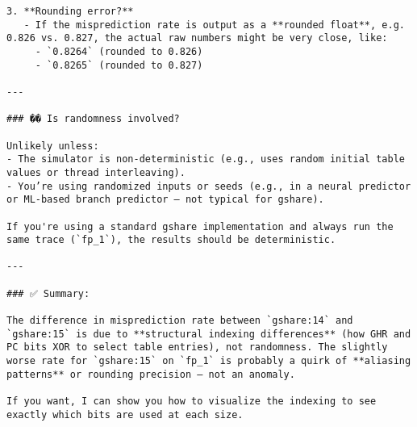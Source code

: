 \documentclass[11pt]{article}
\begin{document}
\begin{verbatim}
3. **Rounding error?**
   - If the misprediction rate is output as a **rounded float**, e.g. 0.826 vs. 0.827, the actual raw numbers might be very close, like:
     - `0.8264` (rounded to 0.826)
     - `0.8265` (rounded to 0.827)

---

### �� Is randomness involved?

Unlikely unless:
- The simulator is non-deterministic (e.g., uses random initial table values or thread interleaving).
- You’re using randomized inputs or seeds (e.g., in a neural predictor or ML-based branch predictor — not typical for gshare).

If you're using a standard gshare implementation and always run the same trace (`fp_1`), the results should be deterministic.

---

### ✅ Summary:

The difference in misprediction rate between `gshare:14` and `gshare:15` is due to **structural indexing differences** (how GHR and PC bits XOR to select table entries), not randomness. The slightly worse rate for `gshare:15` on `fp_1` is probably a quirk of **aliasing patterns** or rounding precision — not an anomaly.

If you want, I can show you how to visualize the indexing to see exactly which bits are used at each size.
\end{verbatim}

\thispagestyle{ack_footer}
\end{document}

